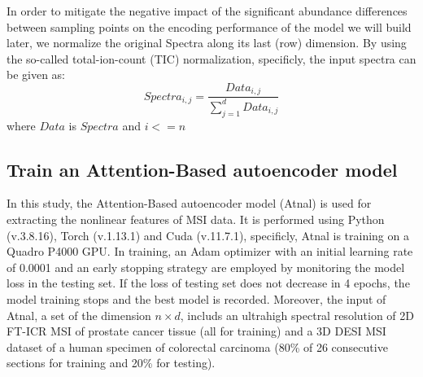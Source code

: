 \documentclass[journal=jacsat,manuscript=article]{achemso}
\begin{document}
In order to mitigate the negative impact of the significant abundance differences 
between sampling points on the encoding performance of the model we will build later, 
we normalize the original Spectra along its last (row) dimension. 
By using the so-called total-ion-count (TIC) normalization, 
specificly, the input spectra can be given as:
\begin{equation}
  \label {eqn:ticnorm}
  Spectra_{i,j}= \frac{Data_{i,j}}{\sum_{j=1}^{d}Data_{i,j}} 
\end{equation}
where $Data$ is $Spectra$ and $i<=n$
\subsection{Train an Attention-Based autoencoder model} 
In this study, the Attention-Based autoencoder model (Atnal) is used for 
extracting the nonlinear features of MSI data. It is performed using Python (v.3.8.16), Torch (v.1.13.1) 
and Cuda (v.11.7.1), specificly, Atnal is training on a Quadro P4000 GPU. In training, 
an Adam optimizer with an initial learning rate of 0.0001 and an early stopping 
strategy are employed by monitoring 
the model loss in the testing set. If the loss of testing set does not 
decrease in 4 epochs, the model training stops and the best model is recorded. 
Moreover, the input of Atnal, a set of the dimension $n \times d$, includs 
an ultrahigh spectral resolution of 2D FT-ICR MSI of prostate cancer tissue (all for training)
and a 3D DESI MSI dataset of a human specimen of colorectal carcinoma 
(80\% of 26 consecutive sections for training and 20\% for testing).
\end{document}

